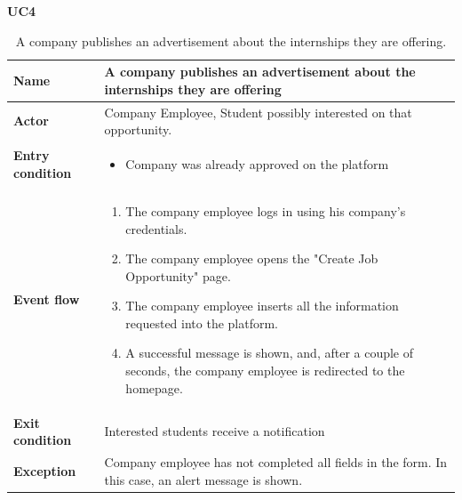     \textbf{UC4}
    \nopagebreak
    \begin{table}[H]
    \centering
    \begin{tabular}{|l|p{11.9cm}|}
        \hline
        \textbf{Name}            & A company publishes an advertisement about the internships they are
offering \\\hline
        \textbf{Actor}           & Company Employee, Student possibly interested on that opportunity.        \\\hline
        \textbf{Entry condition} &
        \begin{itemize}
              \item Company was already approved on the platform
        \end{itemize}                                        \\\hline
        \textbf{Event flow}      &
        \begin{enumerate}[label=\arabic*.]
              \item The company employee logs in using his company's credentials.
              \item The company employee opens the "Create Job Opportunity" page.
              \item The company employee inserts all the information requested into the platform.
              \item A successful message is shown, and, after a couple of seconds, the company employee is redirected to the homepage.
        \end{enumerate}            \\\hline
        \textbf{Exit condition}  & Interested students receive a notification \\\hline
        \textbf{Exception}       &  Company employee has not completed all fields in the form. In this case, an alert message is shown.   \\\hline
    \end{tabular}
    \caption{A company publishes an advertisement about the internships they are offering.}
    \label{table:A company publishes an advertisement about the internships they
are offering}
    \end{table}

